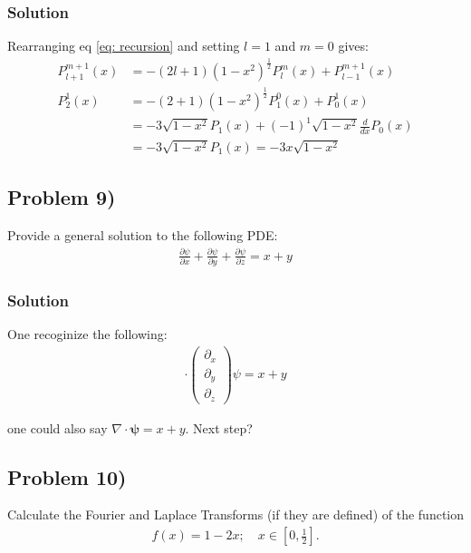 \subsubsection*{Solution}
Rearranging eq \eqref{eq: recursion} and setting $l =1$ and $m = 0$ gives:
\begin{align*}
    P_{l + 1}^{m + 1}(x) &= -(2l +  1)(1-x^2)^{\frac{1}{2}}P_{l}^m(x) + P_{l - 1}^{m + 1}(x)\\
    P_{2}^1(x) &= -(2 +  1)(1-x^2)^{\frac{1}{2}}P_{1}^0(x) + P_{0}^1(x)\\
    &= -3\sqrt{1- x^2}P_1(x) + (-1)^1\sqrt{1 - x^2}\frac{d}{dx}P_0(x)\\
    &= -3\sqrt{1- x^2}P_1(x) = -3x\sqrt{1 - x^2} 
\end{align*}

\subsection*{Problem 9)}
Provide a general solution to the following PDE:
\begin{align*}
    \frac{\partial \psi}{\partial x} + \frac{\partial \psi}{\partial y} + \frac{\partial \psi}{\partial z} = x +y
\end{align*}

\subsubsection*{Solution}
One recoginize the following:
\begin{align*}
    [1,1,1]\cdot\begin{pmatrix}
        \partial_x\\
        \partial_y\\
        \partial_z
    \end{pmatrix}\psi = x +y
\end{align*}
\begin{center}
    one could also say $\nabla\cdot\mathbf{\psi} = x + y$.
    Next step?
\end{center}

\subsection*{Problem 10)}
Calculate the Fourier and Laplace Transforms (if they are defined) of the function
\begin{align*}
    f(x) = 1-2x; \quad x\in\left[0,\frac{1}{2}\right].
\end{align*}
